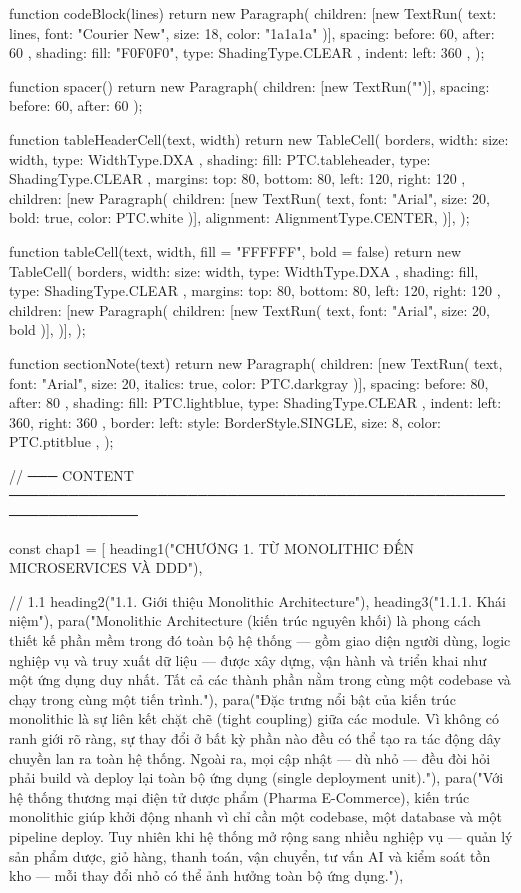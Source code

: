 function codeBlock(lines) {
  return new Paragraph({
    children: [new TextRun({ text: lines, font: "Courier New", size: 18, color: "1a1a1a" })],
    spacing: { before: 60, after: 60 },
    shading: { fill: "F0F0F0", type: ShadingType.CLEAR },
    indent: { left: 360 },
  });
}

function spacer() {
  return new Paragraph({ children: [new TextRun("")], spacing: { before: 60, after: 60 } });
}

function tableHeaderCell(text, width) {
  return new TableCell({
    borders,
    width: { size: width, type: WidthType.DXA },
    shading: { fill: PTC.tableheader, type: ShadingType.CLEAR },
    margins: { top: 80, bottom: 80, left: 120, right: 120 },
    children: [new Paragraph({
      children: [new TextRun({ text, font: "Arial", size: 20, bold: true, color: PTC.white })],
      alignment: AlignmentType.CENTER,
    })],
  });
}

function tableCell(text, width, fill = "FFFFFF", bold = false) {
  return new TableCell({
    borders,
    width: { size: width, type: WidthType.DXA },
    shading: { fill, type: ShadingType.CLEAR },
    margins: { top: 80, bottom: 80, left: 120, right: 120 },
    children: [new Paragraph({
      children: [new TextRun({ text, font: "Arial", size: 20, bold })],
    })],
  });
}

function sectionNote(text) {
  return new Paragraph({
    children: [new TextRun({ text, font: "Arial", size: 20, italics: true, color: PTC.darkgray })],
    spacing: { before: 80, after: 80 },
    shading: { fill: PTC.lightblue, type: ShadingType.CLEAR },
    indent: { left: 360, right: 360 },
    border: { left: { style: BorderStyle.SINGLE, size: 8, color: PTC.ptitblue } },
  });
}

// ─── CONTENT ───────────────────────────────────────────────────────────────

const chap1 = [
  heading1("CHƯƠNG 1. TỪ MONOLITHIC ĐẾN MICROSERVICES VÀ DDD"),

  // 1.1
  heading2("1.1. Giới thiệu Monolithic Architecture"),
  heading3("1.1.1. Khái niệm"),
  para("Monolithic Architecture (kiến trúc nguyên khối) là phong cách thiết kế phần mềm trong đó toàn bộ hệ thống — gồm giao diện người dùng, logic nghiệp vụ và truy xuất dữ liệu — được xây dựng, vận hành và triển khai như một ứng dụng duy nhất. Tất cả các thành phần nằm trong cùng một codebase và chạy trong cùng một tiến trình."),
  para("Đặc trưng nổi bật của kiến trúc monolithic là sự liên kết chặt chẽ (tight coupling) giữa các module. Vì không có ranh giới rõ ràng, sự thay đổi ở bất kỳ phần nào đều có thể tạo ra tác động dây chuyền lan ra toàn hệ thống. Ngoài ra, mọi cập nhật — dù nhỏ — đều đòi hỏi phải build và deploy lại toàn bộ ứng dụng (single deployment unit)."),
  para("Với hệ thống thương mại điện tử dược phẩm (Pharma E-Commerce), kiến trúc monolithic giúp khởi động nhanh vì chỉ cần một codebase, một database và một pipeline deploy. Tuy nhiên khi hệ thống mở rộng sang nhiều nghiệp vụ — quản lý sản phẩm dược, giỏ hàng, thanh toán, vận chuyển, tư vấn AI và kiểm soát tồn kho — mỗi thay đổi nhỏ có thể ảnh hưởng toàn bộ ứng dụng."),


